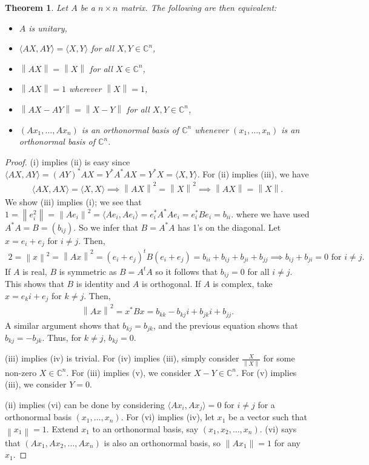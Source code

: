 \documentclass[15pt,a4paper]{book}
\newtheorem{theorem}{Theorem}[chapter]
\theoremstyle{definition}
\newcommand{\C}{\mathbb{C}}
\newcommand{\ip}[1]{\langle #1 \rangle}
\newcommand{\norm}[1]{\left\lVert#1\right\rVert}
\begin{document}
\begin{theorem}
    Let $A$ be a $n \times n$ matrix. The following are then equivalent:
    \begin{itemize}
        \item $A$ is unitary,
        \item $\ip{AX,AY} = \ip{X,Y}$ for all $X,Y \in \C^{n}$,
        \item $\norm{AX} = \norm{X}$ for all $X \in \C^{n}$,
        \item $\norm{AX} = 1$ wherever $\norm{X} = 1$,
        \item $\norm{AX-AY} = \norm{X-Y}$ for all $X,Y \in \C^{n}$,
        \item $(Ax_{1},\ldots,Ax_{n})$ is an orthonormal basis of $\C^{n}$ whenever $(x_{1},\ldots,x_{n})$ is an orthonormal basis of $\C^{n}$.
    \end{itemize}
\end{theorem}
\begin{proof}
    (i) implies (ii) is easy since $\ip{AX,AY} = (AY)^{\ast}AX = Y^{\ast}A^{\ast}AX = Y^{\ast}X = \ip{X,Y}$. For (ii) implies (iii), we have
    \begin{align}
        \ip{AX,AX} = \ip{X,X} \implies \norm{AX}^{2} = \norm{X}^{2} \implies \norm{AX} = \norm{X}.
    \end{align}
    We show (iii) implies (i); we see that $1 = \norm{e_{i}^{2}} = \norm{Ae_{i}}^{2} = \ip{Ae_{i},Ae_{i}} = e_{i}^{\ast}A^{\ast}Ae_{i} = e_{i}^{\ast}Be_{i} = b_{ii}.$ where we have used $A^{\ast}A = B = (b_{ij})$. So we infer that $B = A^{\ast}A$ has 1's on the diagonal. Let $x = e_{i}+e_{j}$ for $i \neq j$. Then,
    \begin{align}
        2 = \norm{x}^{2} = \norm{Ax}^{2} = (e_{i}+e_{j})^{t}B(e_{i}+e_{j}) = b_{ii} + b_{ij} + b_{ji} + b_{jj} \implies b_{ij}+b_{ji} = 0 \text{ for } i \neq j.
    \end{align}
    If $A$ is real, $B$ is symmetric as $B = A^{t}A$ so it follows that $b_{ij} = 0$ for all $i \neq j$. This shows that $B$ is identity and $A$ is orthogonal. If $A$ is complex, take $x = e_{k}i + e_{j}$ for $k \neq j$. Then,
    \begin{align}
        \norm{Ax}^{2} = x^{\ast}Bx = b_{kk}-b_{kj}i+b_{jk}i+b_{jj}.
    \end{align}
    A similar argument shows that $b_{kj} = b_{jk}$, and the previous equation shows that $b_{kj} = -b_{jk}$. Thus, for $k \neq j$, $b_{kj} = 0$.

    (iii) implies (iv) is trivial. For (iv) implies (iii), simply consider $\frac{X}{\norm{X}}$ for some non-zero $X \in \C^{n}$. For (iii) implies (v), we consider $X-Y \in \C^{n}$. For (v) implies (iii), we consider $Y = 0$.

    (ii) implies (vi) can be done by considering $\ip{Ax_{i},Ax_{j}} = 0$ for $i \neq j$ for a orthonormal basis $(x_{1},\ldots,x_{n})$. For (vi) implies (iv), let $x_{1}$ be a vector such that $\norm{x_{1}} = 1$. Extend $x_{1}$ to an orthonormal basis, say $(x_{1},x_{2},\ldots,x_{n})$. (vi) says that $(Ax_{1},Ax_{2},\ldots,Ax_{n})$ is also an orthonormal basis, so $\norm{Ax_{1}} = 1$ for any $x_{1}$.
\end{proof}
\end{document}
